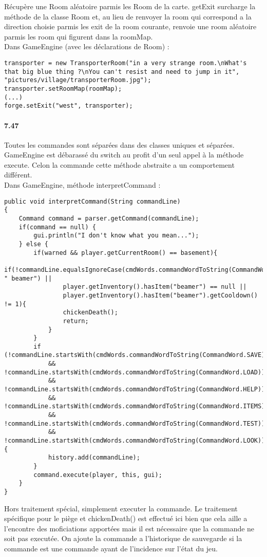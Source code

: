 \documentclass[11pt,a4paper]{report}
\begin{document}
Récupère une Room aléatoire parmis les Room de la carte. getExit surcharge la méthode de la classe Room et, au lieu de renvoyer la room qui correspond a la direction choisie parmis les exit de la room courante, renvoie une room aléatoire parmis les room qui figurent dans la roomMap.\\
Dans GameEngine (avec les déclarations de Room) :
\begin{lstlisting}
transporter = new TransporterRoom("in a very strange room.\nWhat's that big blue thing ?\nYou can't resist and need to jump in it", "pictures/village/transporterRoom.jpg");
transporter.setRoomMap(roomMap);
(...)
forge.setExit("west", transporter);
\end{lstlisting}

\paragraph{7.47}
Toutes les commandes sont séparées dans des classes uniques et séparées. GameEngine est débarassé du switch au profit d'un seul appel à la méthode execute. Celon la commande cette méthode abstraite a un comportement différent.\\
Dans GameEngine, méthode interpretCommand :
\begin{lstlisting}
public void interpretCommand(String commandLine)
{
    Command command = parser.getCommand(commandLine);
    if(command == null) {
        gui.println("I don't know what you mean...");
    } else {
        if(warned && player.getCurrentRoom() == basement){
            if(!commandLine.equalsIgnoreCase(cmdWords.commandWordToString(CommandWord.USE)+ " beamer") ||
                player.getInventory().hasItem("beamer") == null ||
                player.getInventory().hasItem("beamer").getCooldown() != 1){
                chickenDeath();
                return;
            }
        }
        if (!commandLine.startsWith(cmdWords.commandWordToString(CommandWord.SAVE))
            && !commandLine.startsWith(cmdWords.commandWordToString(CommandWord.LOAD))
            && !commandLine.startsWith(cmdWords.commandWordToString(CommandWord.HELP))
            && !commandLine.startsWith(cmdWords.commandWordToString(CommandWord.ITEMS))
            && !commandLine.startsWith(cmdWords.commandWordToString(CommandWord.TEST))
            && !commandLine.startsWith(cmdWords.commandWordToString(CommandWord.LOOK))) {
            history.add(commandLine);
        }
        command.execute(player, this, gui);
    }
}
\end{lstlisting}
Hors traitement spécial, simplement executer la commande. Le traitement spécifique pour le piège et chickenDeath() est effectué ici bien que cela aille a l'encontre des moficiations apportées mais il est nécessaire que la commande ne soit pas executée. On ajoute la commande a l'historique de sauvegarde si la commande est une commande ayant de l'incidence sur l'état du jeu.
\end{document}
